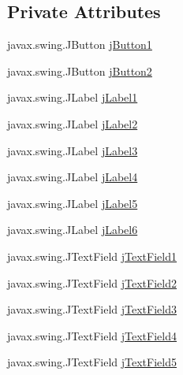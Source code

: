 \subsection*{Private Attributes}
\begin{DoxyCompactItemize}
\item 
javax.\+swing.\+J\+Button \mbox{\hyperlink{class_interfaz_package_1_1_alta_lectores_a022b628c2a9a98d3d2e05f2776bad642}{j\+Button1}}
\item 
javax.\+swing.\+J\+Button \mbox{\hyperlink{class_interfaz_package_1_1_alta_lectores_a8e96fe07c387d4a3215d30dc25442f6a}{j\+Button2}}
\item 
javax.\+swing.\+J\+Label \mbox{\hyperlink{class_interfaz_package_1_1_alta_lectores_a3c66bd5bf27274226564fa37c644c9e7}{j\+Label1}}
\item 
javax.\+swing.\+J\+Label \mbox{\hyperlink{class_interfaz_package_1_1_alta_lectores_adfb75b51296b24b4165ef9d2ffe4e9fd}{j\+Label2}}
\item 
javax.\+swing.\+J\+Label \mbox{\hyperlink{class_interfaz_package_1_1_alta_lectores_a8540271f20afc2b5d9e7b8ece4ec5e93}{j\+Label3}}
\item 
javax.\+swing.\+J\+Label \mbox{\hyperlink{class_interfaz_package_1_1_alta_lectores_a39c95238a43795188e9eeeafa177e0c8}{j\+Label4}}
\item 
javax.\+swing.\+J\+Label \mbox{\hyperlink{class_interfaz_package_1_1_alta_lectores_a59070bf77faf3741fbd2648451cd3075}{j\+Label5}}
\item 
javax.\+swing.\+J\+Label \mbox{\hyperlink{class_interfaz_package_1_1_alta_lectores_a8af45e7375fe9c6f739b4d5bc09bb983}{j\+Label6}}
\item 
javax.\+swing.\+J\+Text\+Field \mbox{\hyperlink{class_interfaz_package_1_1_alta_lectores_ac08649a21b3eae20582e25d3fb7a1ed9}{j\+Text\+Field1}}
\item 
javax.\+swing.\+J\+Text\+Field \mbox{\hyperlink{class_interfaz_package_1_1_alta_lectores_a3f30dbff470e9749421774f5da8d8833}{j\+Text\+Field2}}
\item 
javax.\+swing.\+J\+Text\+Field \mbox{\hyperlink{class_interfaz_package_1_1_alta_lectores_a1043b2ff62e3dcae79fb652d7891a131}{j\+Text\+Field3}}
\item 
javax.\+swing.\+J\+Text\+Field \mbox{\hyperlink{class_interfaz_package_1_1_alta_lectores_a933106873681982ae326743f58efd3d5}{j\+Text\+Field4}}
\item 
javax.\+swing.\+J\+Text\+Field \mbox{\hyperlink{class_interfaz_package_1_1_alta_lectores_a8486f57ea492fe17d177c837d057d73e}{j\+Text\+Field5}}
\end{DoxyCompactItemize}


